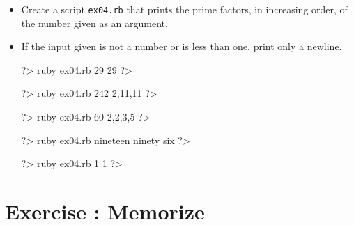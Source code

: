 \documentclass{42-en}
\begin{document}
\exnumber{\exercicenumber}


\begin{itemize}

\item Create a script \texttt{ex04.rb} that prints the prime factors, in increasing order, of the number given as an argument.
\item If the input given is not a number or is less than one, print only a newline.

\begin{42console}
	?> ruby ex04.rb 29
	29
	?>
\end{42console}

\begin{42console}
	?> ruby ex04.rb 242
	2,11,11
	?>
\end{42console}

\begin{42console}
	?> ruby ex04.rb 60
	2,2,3,5
	?>
\end{42console}

\begin{42console}
	?> ruby ex04.rb nineteen ninety six
	?>
\end{42console}

\begin{42console}
	?> ruby ex04.rb 1
	1
	?>
\end{42console}

\end{itemize}


\chapter{Exercise \exercicenumber: Memorize}

\exnumber{\exercicenumber}

\end{document}
